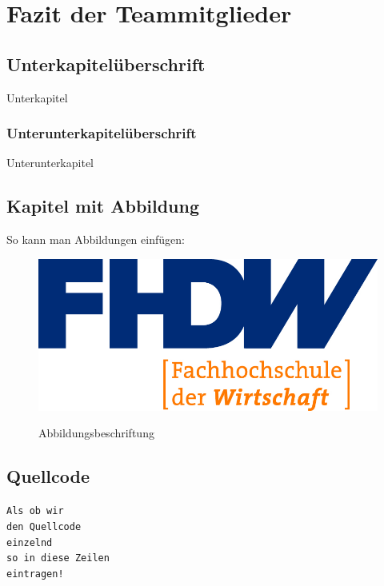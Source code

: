 \section{Fazit der Teammitglieder}
\label{instal}

\subsection{Unterkapitelüberschrift}

Unterkapitel

\subsubsection{Unterunterkapitelüberschrift}

Unterunterkapitel

\subsection{Kapitel mit Abbildung}

So kann man Abbildungen einfügen:

\begin{figure}[hbt]
\centering
\begin{minipage}[t]{1\textwidth} %
\caption{Abbildungsbeschriftung} %
\includegraphics[width=1\textwidth]{img/fhdw}\\ %
\end{minipage}
\end{figure}

\subsection{Quellcode}

\texttt{Als ob wir}\\
\texttt{den Quellcode}\\
\texttt{einzelnd}\\
\texttt{so in diese Zeilen}\\
\texttt{eintragen!}\\
